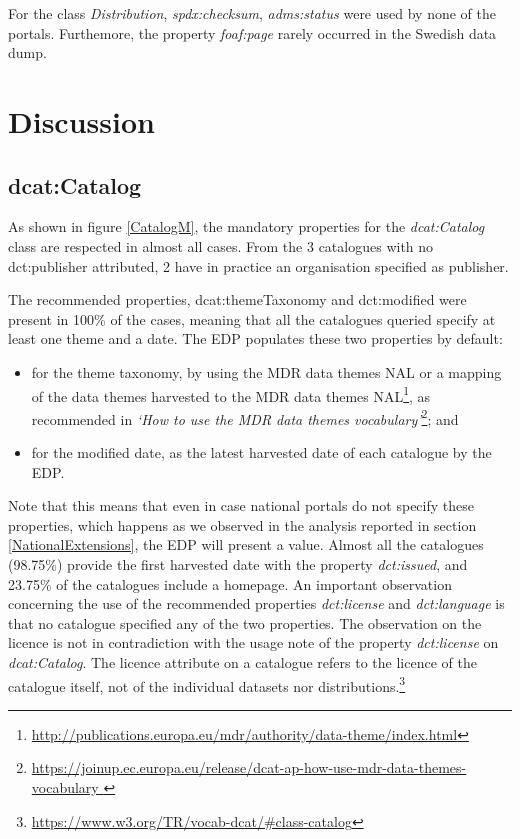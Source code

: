 \documentclass[<options>]{elsarticle}
\begin{document}
For the class \textit{Distribution}, \textit{spdx:checksum}, \textit{adms:status} were used by none of the portals. Furthemore, the property \textit{foaf:page} rarely occurred in the Swedish data dump.

\section{Discussion}\label{discussion}
\subsection{dcat:Catalog}


As shown in figure \ref{CatalogM}, the mandatory properties for the \textit{dcat:Catalog} class are respected in almost all cases. From the 3 catalogues with no dct:publisher attributed, 2  have in practice an organisation specified as publisher.

The recommended properties, dcat:themeTaxonomy and dct:modified were present in 100\% of the cases, meaning that all the catalogues queried specify at least one theme and a date. The EDP populates these two properties by default:
\begin{itemize}
\item for the theme taxonomy, by using the MDR data themes NAL or a mapping of the data themes harvested to the MDR data themes NAL\footnote{\href{http://publications.europa.eu/mdr/authority/data-theme/index.html}{ http://publications.europa.eu/mdr/authority/data-theme/index.html}}, as recommended in \textit{`How to use the MDR data themes vocabulary'}\footnote{\href{https://joinup.ec.europa.eu/release/dcat-ap-how-use-mdr-data-themes-vocabulary}{  https://joinup.ec.europa.eu/release/dcat-ap-how-use-mdr-data-themes-vocabulary }}; and
\item for the modified date, as the latest harvested date of each catalogue by the EDP.
\end{itemize}
Note that this means that even in case national portals do not specify these properties, which happens as we observed in the analysis reported in section \ref{NationalExtensions}, the EDP will present a value. Almost all the catalogues (98.75\%) provide the first harvested date with the property \textit{dct:issued}, and 23.75\% of the catalogues include a homepage. 
An important observation concerning the use of the recommended properties \textit{dct:license} and \textit{dct:language} is that no catalogue specified any of the two properties. The observation on the licence is not in contradiction with the usage note of the property \textit{dct:license} on \textit{dcat:Catalog}. The licence attribute on a catalogue refers to the licence of the catalogue itself, not of the individual datasets nor distributions.\footnote{\href{https://www.w3.org/TR/vocab-dcat/\#class-catalog}{https://www.w3.org/TR/vocab-dcat/\#class-catalog}} 
\end{document}
